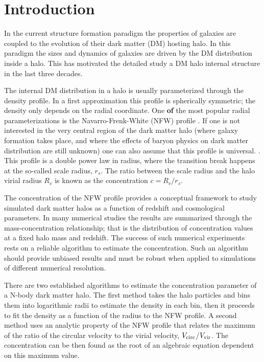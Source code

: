 \documentclass{emulateapj}
\begin{document}


\section{Introduction}
\label{sec:introduction}
In the current structure formation paradigm the properties of galaxies
are coupled to the evolution of their dark matter (DM) hosting halo.
In this paradigm the sizes and dynamics of galaxies are driven by
the DM distribution inside a halo. This has motivated the detailed study
a DM halo internal structure in the last three decades. 

The internal DM distribution in a halo is usually parameterized
through the density profile.  In a first approximation this profile is
spherically symmetric; the density only depends on the radial
coordinate.  One {\bf of} the most popular radial parameterizations is
the Navarro-Frenk-White (NFW) profile \citep{NFW}.  If one is not
interested in the very central region of the dark matter halo (where
galaxy formation takes place, and where the effects of baryon physics
on dark matter distribution are still unknown) one can also assume
that this profile is universal.  \citep{Navarro2010}.  This profile is
a double power law in radius, where the transition break happens at
the so-called scale radius, $r_s$.  The ratio between the scale radius
and the halo virial radius $R_v$ is known as the concentration
$c=R_v/r_s$.


The concentration of the NFW profile provides a conceptual framework
to study simulated dark matter halos as a function of redshift and
cosmological parameters.  In many numerical studies
\citep{Neto2007,Maccio2008,Duffy2008,Munoz2011,Prada2012,Ludlow2014}
the results are summarized through the mass-concentration
relationship; that is the distribution of concentration values at a
fixed halo mass and redshift.  The success of such numerical
experiments rests on a reliable algorithm to estimate the
concentration.  Such an algorithm should provide unbiased results and
must be robust when applied to simulations of different numerical
resolution.

There are two established algorithms to estimate the concentration
parameter of a N-body dark matter halo.  The first method takes the
halo particles and bins them into logarithmic radii to estimate the
density in each bin, then it proceeds to fit the density as a function
of the radius to the NFW profile.  A second method uses an analytic
property of the NFW profile that relates the maximum of the ratio of
the circular velocity to the virial velocity, $V_{\rm circ}$/$V_{\rm
  vir}$.  The concentration can be then found as the root of an
algebraic equation dependent on this maximum value.
\end{document}
